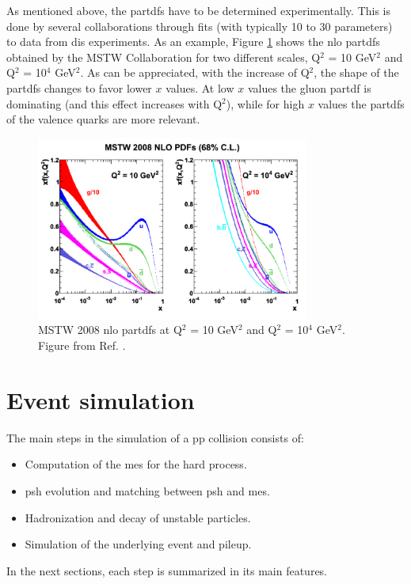 As mentioned above, the \glspl{partdf} have to be determined experimentally. This is done by several collaborations through fits (with typically 10 to 30 parameters) to data from \gls{dis} experiments. As an example, Figure \ref{fig:sim:pp} shows the \gls{nlo} \glspl{partdf} obtained by the MSTW Collaboration for two different scales, Q$^2$ = 10 GeV$^2$ and Q$^2$ = 10$^4$ GeV$^2$. As can be appreciated, with the increase of Q$^2$, the shape of the \glspl{partdf} changes to favor lower $x$ values. At low $x$ values the gluon \gls{partdf} is dominating (and this effect increases with Q$^2$), while for high $x$ values the \glspl{partdf} of the valence quarks are more relevant.

\begin{figure}[h]
\begin{center}
    \includegraphics[width=0.8\textwidth]{figures/simul/pdf}
\end{center}
\caption{MSTW 2008 \gls{nlo} \glspl{partdf} at Q$^2$ = 10 GeV$^2$ and Q$^2$ = 10$^4$ GeV$^2$. Figure from Ref. \cite{Martin:2009iq}.}
 \label{fig:sim:pp}
\end{figure}


\section{Event simulation}
\label{sec:eventsimul}

The main steps in the simulation of a \gls{pp} collision consists of:
\begin{itemize}
\item Computation of the \glspl{me} for the hard process.
\item \Gls{psh} evolution and matching between \gls{psh} and \glspl{me}.
\item Hadronization and decay of unstable particles.
\item Simulation of the underlying event and pileup.
\end{itemize}
In the next sections, each step is summarized in its main features.

